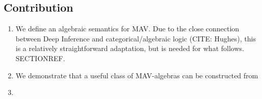 \subsection{Contribution}\label{sec:contribution}

\begin{enumerate}
  \item We define an algebraic semantics for MAV. Due to the close
        connection between Deep Inference and categorical/algebraic logic
        (CITE: Hughes), this is a relatively straightforward adaptation, but
        is needed for what follows. SECTIONREF.
  \item We demonstrate that a useful class of MAV-algebras can be
        constructed from
  \item
\end{enumerate}
